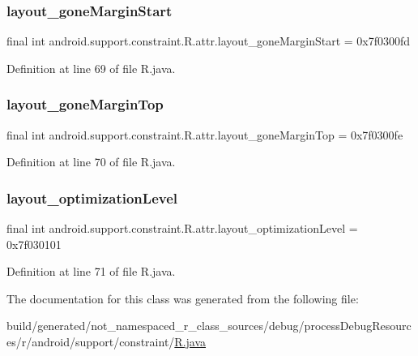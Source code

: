 \subsubsection{\texorpdfstring{layout\_goneMarginStart}{layout\_goneMarginStart}}
{\footnotesize\ttfamily final int android.\+support.\+constraint.\+R.\+attr.\+layout\+\_\+gone\+Margin\+Start = 0x7f0300fd\hspace{0.3cm}{\ttfamily [static]}}



Definition at line 69 of file R.\+java.

\mbox{\label{classandroid_1_1support_1_1constraint_1_1_r_1_1attr_a305701c04de581e4593ac38844061adc}} 
\subsubsection{\texorpdfstring{layout\_goneMarginTop}{layout\_goneMarginTop}}
{\footnotesize\ttfamily final int android.\+support.\+constraint.\+R.\+attr.\+layout\+\_\+gone\+Margin\+Top = 0x7f0300fe\hspace{0.3cm}{\ttfamily [static]}}



Definition at line 70 of file R.\+java.

\mbox{\label{classandroid_1_1support_1_1constraint_1_1_r_1_1attr_a54cee958221f1d1e32255db5fa73d364}} 
\subsubsection{\texorpdfstring{layout\_optimizationLevel}{layout\_optimizationLevel}}
{\footnotesize\ttfamily final int android.\+support.\+constraint.\+R.\+attr.\+layout\+\_\+optimization\+Level = 0x7f030101\hspace{0.3cm}{\ttfamily [static]}}



Definition at line 71 of file R.\+java.



The documentation for this class was generated from the following file\+:\begin{DoxyCompactItemize}
\item 
build/generated/not\+\_\+namespaced\+\_\+r\+\_\+class\+\_\+sources/debug/process\+Debug\+Resources/r/android/support/constraint/\mbox{\hyperlink{android_2support_2constraint_2_r_8java}{R.\+java}}\end{DoxyCompactItemize}
